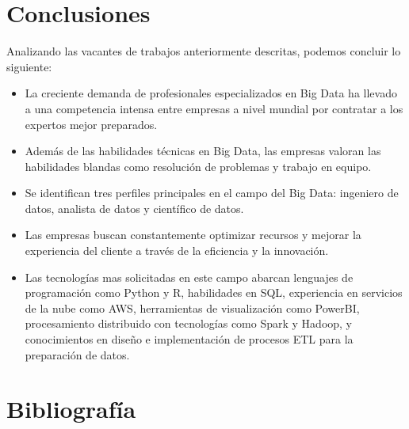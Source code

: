 \documentclass[12pt]{article}
\begin{document}
\begin{enumerate}
                \end{enumerate}

    \newpage


    

    \section{Conclusiones}

        \noindent Analizando las vacantes de trabajos anteriormente descritas, podemos concluir lo siguiente:

        \begin{itemize}[label=$\bullet$] 
            \item La creciente demanda de profesionales especializados en Big Data ha llevado a una competencia intensa entre empresas a nivel mundial por contratar a los expertos mejor preparados. 
            \item Además de las habilidades técnicas en Big Data, las empresas valoran las habilidades blandas como resolución de problemas y trabajo en equipo. 
            \item Se identifican tres perfiles principales en el campo del Big Data: ingeniero de datos, analista de datos y científico de datos. 
            \item Las empresas buscan constantemente optimizar recursos y mejorar la experiencia del cliente a través de la eficiencia y la innovación.
            \item Las tecnologías mas solicitadas en este campo abarcan lenguajes de programación como Python y R, habilidades en SQL, experiencia en servicios de la nube como AWS, herramientas de visualización como PowerBI, procesamiento distribuido con tecnologías como Spark y Hadoop, y conocimientos en diseño e implementación de procesos ETL para la preparación de datos.
        \end{itemize}

    \newpage



    \section{Bibliografía}
\end{document}
